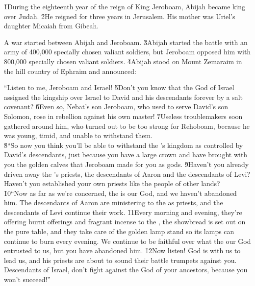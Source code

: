\v{1}During the eighteenth year of the reign of King Jeroboam, Abijah became king over Judah. \v{2}He reigned for three years in Jerusalem. His mother was Uriel's daughter Micaiah from Gibeah.

A war started between Abijah and Jeroboam. \v{3}Abijah started the battle with an army of 400,000 specially chosen valiant soldiers, but Jeroboam opposed him with 800,000 specially chosen valiant soldiers. \v{4}Abijah stood on Mount Zemaraim in the hill country of Ephraim and announced:

\begin{poetry}
\poeml ``Listen to me, Jeroboam and Israel! \v{5}Don't you know that the  God of Israel assigned the kingship over Israel to David and his descendants forever by a salt covenant? \v{6}Even so, Nebat's son Jeroboam, who used to serve David's son Solomon, rose in rebellion against his own master! \v{7}Useless troublemakers soon gathered around him, who turned out to be too strong for Rehoboam, because he was young, timid, and unable to withstand them. \\
\poeml \v{8}``So now you think you'll be able to withstand the 's kingdom as controlled by David's descendants, just because you have a large crown and have brought with you the golden calves that Jeroboam made for you as gods. \v{9}Haven't you already driven away the 's priests, the descendants of Aaron and the descendants of Levi? Haven't you established your own priests like the people of other lands? \\
\poeml \v{10}``Now as far as we're concerned, the  is our God, and we haven't abandoned him. The descendants of Aaron are ministering to the  as priests, and the descendants of Levi continue their work. \v{11}Every morning and evening, they're offering burnt offerings and fragrant incense to the , the showbread is set out on the pure table, and they take care of the golden lamp stand so its lamps can continue to burn every evening. We continue to be faithful over what the  our God entrusted to us, but you have abandoned him. \v{12}Now listen! God is with us to lead us, and his priests are about to sound their battle trumpets against you. Descendants of Israel, don't fight against the  God of your ancestors, because you won't succeed!''
\end{poetry}

